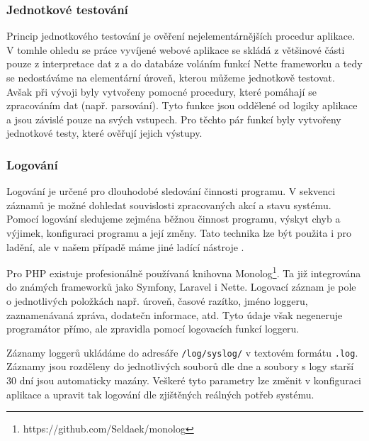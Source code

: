 \documentclass[czech,BP]{thesiskiv}
\begin{document}
		\subsubsection{Jednotkové testování}
		\par Princip jednotkového testování je ověření nejelementárnějších procedur aplikace. V tomhle ohledu se práce vyvíjené webové aplikace se skládá z většinové části pouze z interpretace dat z a do databáze voláním funkcí Nette frameworku a tedy se nedostáváme na elementární úroveň, kterou můžeme jednotkově testovat. Avšak při vývoji byly vytvořeny pomocné procedury, které pomáhají se zpracováním dat (např. parsování). Tyto funkce jsou oddělené od logiky aplikace a jsou závislé pouze na svých vstupech. Pro těchto pár funkcí byly vytvořeny jednotkové testy, které ověřují jejich výstupy.
		
		\subsubsection{Logování}
		\par Logování je určené pro dlouhodobé sledování činnosti programu. V sekvenci záznamů je možné dohledat souvislosti zpracovaných akcí a stavu systému. Pomocí logování sledujeme zejména běžnou činnost programu, výskyt chyb a výjimek, konfiguraci programu a její změny. Tato technika lze být použita i pro ladění, ale v našem případě máme jiné ladící nástroje \cite{OKSPrednasky}.
		\par Pro PHP existuje profesionálně používaná knihovna Monolog\footnote{https://github.com/Seldaek/monolog}. Ta již integrována do známých frameworků jako Symfony, Laravel i Nette. Logovací záznam je pole o jednotlivých položkách např. úroveň, časové razítko, jméno loggeru, zaznamenávaná zpráva, dodatečn informace, atd. Tyto údaje však negeneruje programátor přímo, ale zpravidla pomocí logovacích funkcí loggeru.
		\par Záznamy loggerů ukládáme do adresáře \texttt{/log/syslog/} v textovém formátu \texttt{.log}. Záznamy jsou rozděleny do jednotlivých souborů dle dne a soubory s logy starší 30 dní jsou automaticky mazány. Veškeré tyto parametry lze změnit v konfiguraci aplikace a upravit tak logování dle zjištěných reálných potřeb systému.
		
\end{document}
